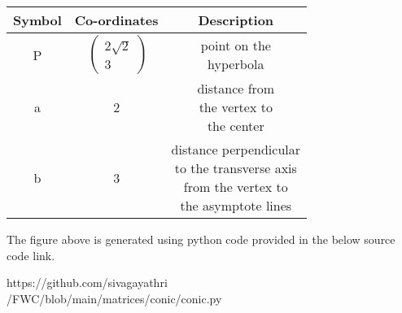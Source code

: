 \documentclass[a4paper,10pt]{report}
\begin{document}
\begin{multicols}{2}
\begin{center}
    \label{tab:truthtable}
    \setlength{\arrayrulewidth}{0.2mm}
\setlength{\tabcolsep}{5pt}
\renewcommand{\arraystretch}{1.25}
    \begin{tabular}{|c|c|c|}
    \hline %
      \large\textbf{Symbol} & \large\textbf{Co-ordinates} & \large\textbf{Description}\\
      \hline
	    \large P & $\ \begin{pmatrix} 2\sqrt{2} \\ 3 \end{pmatrix}$ & \makecell {point on the \\ hyperbola} \\

	\large a & 2 &\makecell {distance from \\ the  vertex to \\ the center}\\
	\large b & 3 &\makecell {distance perpendicular \\ to the transverse axis \\ from the vertex to \\ the asymptote lines }\\
      \hline
   \end{tabular}
 \end{center}
\raggedright\large{The figure above is generated using python code provided in the below source code link.} \\
\begin{mdframed}
\raggedright\large{https://github.com/sivagayathri \\ /FWC/blob/main/matrices/conic/conic.py}
\end{mdframed}
\end{multicols}
\end{document}
